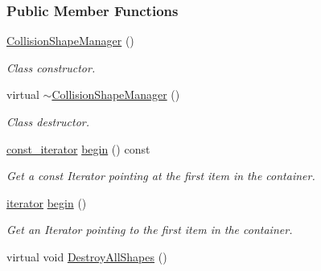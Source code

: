 \subsubsection*{Public Member Functions}
\begin{DoxyCompactItemize}
\item 
\hypertarget{classMezzanine_1_1CollisionShapeManager_a47c3e4e886e22abb3c8017e8f244cac2}{
\hyperlink{classMezzanine_1_1CollisionShapeManager_a47c3e4e886e22abb3c8017e8f244cac2}{CollisionShapeManager} ()}
\label{classMezzanine_1_1CollisionShapeManager_a47c3e4e886e22abb3c8017e8f244cac2}

\begin{DoxyCompactList}\small\item\em Class constructor. \item\end{DoxyCompactList}\item 
\hypertarget{classMezzanine_1_1CollisionShapeManager_aaa11539e5740540ec299c616b54556bf}{
virtual \hyperlink{classMezzanine_1_1CollisionShapeManager_aaa11539e5740540ec299c616b54556bf}{$\sim$CollisionShapeManager} ()}
\label{classMezzanine_1_1CollisionShapeManager_aaa11539e5740540ec299c616b54556bf}

\begin{DoxyCompactList}\small\item\em Class destructor. \item\end{DoxyCompactList}\item 
\hyperlink{classMezzanine_1_1CollisionShapeManager_a44318f2b04d35ecc76d5c58ea574f0f0}{const\_\-iterator} \hyperlink{classMezzanine_1_1CollisionShapeManager_ad588bcca5ef47d467439171edf5640a0}{begin} () const 
\begin{DoxyCompactList}\small\item\em Get a const Iterator pointing at the first item in the container. \item\end{DoxyCompactList}\item 
\hyperlink{classMezzanine_1_1CollisionShapeManager_abec03ca004aae3ce0dc478e34e5d1252}{iterator} \hyperlink{classMezzanine_1_1CollisionShapeManager_a8b73066314e6fe91cce3507f5d85584f}{begin} ()
\begin{DoxyCompactList}\small\item\em Get an Iterator pointing to the first item in the container. \item\end{DoxyCompactList}\item 
\hypertarget{classMezzanine_1_1CollisionShapeManager_aa7d9c7a9fe78def866e1abc02b261b53}{
virtual void \hyperlink{classMezzanine_1_1CollisionShapeManager_aa7d9c7a9fe78def866e1abc02b261b53}{DestroyAllShapes} ()}
\label{classMezzanine_1_1CollisionShapeManager_aa7d9c7a9fe78def866e1abc02b261b53}


\end{DoxyCompactItemize}
